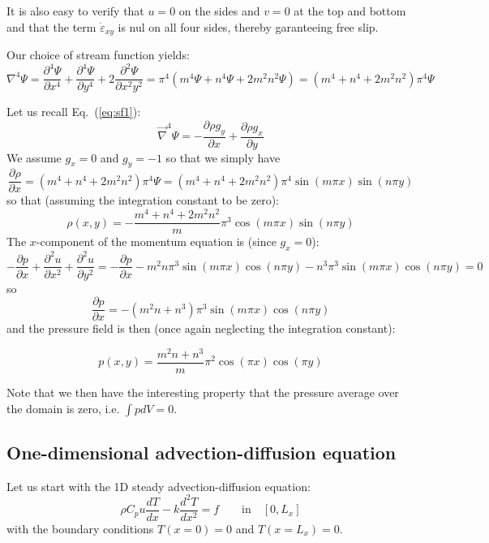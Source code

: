 It is also easy to verify that $u=0$ on the sides and $v=0$ at the top and bottom and that the 
term $\dot\varepsilon_{xy}$ is nul on all four sides, thereby garanteeing free slip. 

Our choice of stream function yields:
\[
{\nabla}^4 \Psi= 
\frac{\partial^4 \Psi}{\partial x^4}+
\frac{\partial^4 \Psi}{\partial y^4}+
2\frac{\partial^2 \Psi}{\partial x^2 y^2}
=\pi^4 ( m^4 \Psi + n^4 \Psi + 2m^2n^2 \Psi) = (m^4 + n^4 + 2m^2n^2)\pi^4 \Psi
\]

Let us recall Eq.~(\ref{eq:sf1}):
\begin{equation}
{\vec \nabla}^4 \Psi 
=
-\frac{\partial \rho g_y}{\partial x} + \frac{\partial \rho g_x}{\partial y}   
\end{equation}
We assume $g_x=0$ and $g_y=-1$ so that we simply have 
\begin{equation}
\frac{\partial \rho}{\partial x}
=
(m^4 + n^4 + 2m^2n^2)\pi^4 \Psi 
=
(m^4 + n^4 + 2m^2n^2)\pi^4 \sin( m \pi x)\sin( n\pi y)
\end{equation}
so that (assuming the integration constant to be zero):
\[
\rho(x,y) = -\frac{m^4 + n^4 + 2m^2n^2}{m} \pi^3  \cos(m \pi x)\sin(n \pi y)
\]
The $x$-component of the momentum equation is (since $g_x=0$): 
\[
-\frac{\partial p}{\partial x} + 
\frac{\partial^2 u}{\partial x^2}+
\frac{\partial^2 u}{\partial y^2} =
-\frac{\partial p}{\partial x} 
-m^2 n \pi^3 \sin (m\pi x)\cos(n\pi y)
- n^3 \pi^3 \sin (m\pi x)\cos(n\pi y)
=0
\]
so 
\[
\frac{\partial p}{\partial x} =-(m^2n+n^3)\pi^3 \sin (m\pi x)\cos(n \pi y)
\]
and the pressure field is then (once again neglecting the integration constant):
\begin{mdframed}[backgroundcolor=blue!5]
\[
p(x,y)= \frac{m^2n+n^3}{m} \pi^2 \cos (\pi x)\cos(\pi y)
\]
\end{mdframed}
Note that we then have the interesting property that the pressure average 
over the domain is zero, i.e. $\int p dV =0$.





\subsection{One-dimensional advection-diffusion equation \label{ss:advdiff} }

Let us start with the 1D steady advection-diffusion equation:
\begin{equation}
\rho C_p u \frac{dT}{dx} - k \frac{d^2T}{dx^2} = f \qquad \text{in} \quad [0,L_x]
\end{equation}
with the boundary conditions $T(x=0)=0$ and $T(x=L_x)=0$.

